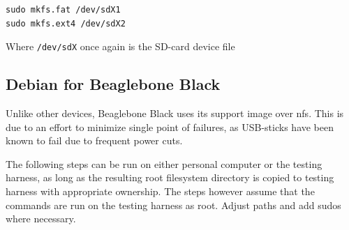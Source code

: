 \documentclass[a4paper,11pt]{article}
\newcommand{\cmd}[1]{\texttt{#1}}
\begin{document}
\begin{enumerate}
\begin{lstlisting}
sudo mkfs.fat /dev/sdX1
sudo mkfs.ext4 /dev/sdX2
\end{lstlisting}

Where \cmd{/dev/sdX} once again is the SD-card device file
\end{enumerate}

\subsection{Debian for Beaglebone Black}
\label{bbbdebian}

Unlike other devices, Beaglebone Black uses its support image over nfs. This is due to an effort to minimize single point of failures, as USB-sticks have been known to fail due to frequent power cuts. 

The following steps can be run on either personal computer or the testing harness, as long as the resulting root filesystem directory is copied to testing harness with appropriate ownership. The steps however assume that the commands are run on the testing harness as root. Adjust paths and add sudos where necessary.
\end{document}
